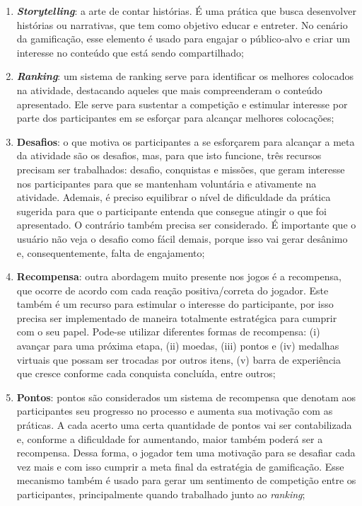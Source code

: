 \documentclass[12pt]{article}
\begin{document}
\begin{enumerate}
    \item \textit{\textbf{Storytelling}}: a arte de contar histórias. É uma prática que busca desenvolver histórias ou narrativas, que tem como objetivo educar e entreter. No cenário da gamificação, esse elemento é usado para engajar o público-alvo e criar um interesse no conteúdo que está sendo compartilhado;
    \item \textit{\textbf{Ranking}}: um sistema de ranking serve para identificar os melhores colocados na atividade, destacando aqueles que mais compreenderam o conteúdo apresentado. Ele serve para sustentar a competição e estimular interesse por parte dos participantes em se esforçar para alcançar melhores colocações;
    \item \textbf{Desafios}: o que motiva os participantes a se esforçarem para alcançar a meta da atividade são os desafios, mas, para que isto funcione, três recursos precisam ser trabalhados: desafio, conquistas e missões, que geram interesse nos participantes para que se mantenham voluntária e ativamente na atividade. Ademais, é preciso equilibrar o nível de dificuldade da prática sugerida para que o participante entenda que consegue atingir o que foi apresentado. O contrário também precisa ser considerado. É importante que o usuário não veja o desafio como fácil demais, porque isso vai gerar desânimo e, consequentemente, falta de engajamento;
    \item \textbf{Recompensa}: outra abordagem muito presente nos jogos é a recompensa, que ocorre de acordo com cada reação positiva/correta do jogador. Este também é um recurso para estimular o interesse do participante, por isso precisa ser implementado de maneira totalmente estratégica para cumprir com o seu papel. Pode-se utilizar diferentes formas de recompensa: (i) avançar para uma próxima etapa, (ii) moedas, (iii) pontos e (iv) medalhas virtuais que possam ser trocadas por outros itens, (v) barra de experiência que cresce conforme cada conquista concluída, entre outros;
    \item \textbf{Pontos}: pontos são considerados um sistema de recompensa que denotam aos participantes seu progresso no processo e aumenta sua motivação com as práticas. A cada acerto uma certa quantidade de pontos vai ser contabilizada e, conforme a dificuldade for aumentando, maior também poderá ser a recompensa. Dessa forma, o jogador tem uma motivação para se desafiar cada vez mais e com isso cumprir a meta final da estratégia de gamificação. Esse mecanismo também é usado para gerar um sentimento de competição entre os participantes, principalmente quando trabalhado junto ao \textit{ranking};

\end{enumerate}
\end{document}
